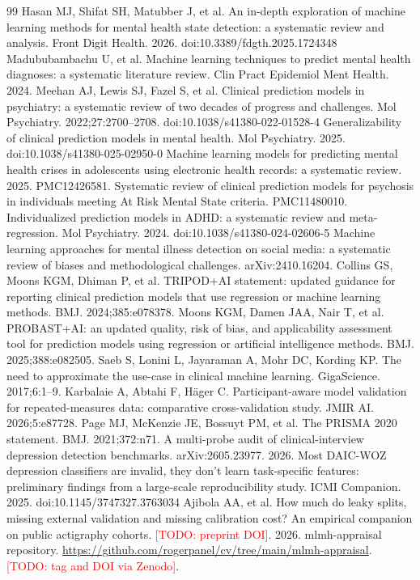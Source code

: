 \documentclass[11pt,a4paper]{article}
\newcommand{\todo}[1]{\textcolor{red}{[TODO: #1]}}
\begin{document}
\begin{thebibliography}{99}\footnotesize
{} Hasan MJ, Shifat SH, Matubber J, et al. An in-depth exploration of machine learning methods for mental health state detection: a systematic review and analysis. Front Digit Health. 2026. doi:10.3389/fdgth.2025.1724348
 Madububambachu U, et al. Machine learning techniques to predict mental health diagnoses: a systematic literature review. Clin Pract Epidemiol Ment Health. 2024.
 Meehan AJ, Lewis SJ, Fazel S, et al. Clinical prediction models in psychiatry: a systematic review of two decades of progress and challenges. Mol Psychiatry. 2022;27:2700--2708. doi:10.1038/s41380-022-01528-4
 Generalizability of clinical prediction models in mental health. Mol Psychiatry. 2025. doi:10.1038/s41380-025-02950-0
 Machine learning models for predicting mental health crises in adolescents using electronic health records: a systematic review. 2025. PMC12426581.
 Systematic review of clinical prediction models for psychosis in individuals meeting At Risk Mental State criteria. PMC11480010.
 Individualized prediction models in ADHD: a systematic review and meta-regression. Mol Psychiatry. 2024. doi:10.1038/s41380-024-02606-5
 Machine learning approaches for mental illness detection on social media: a systematic review of biases and methodological challenges. arXiv:2410.16204.
 Collins GS, Moons KGM, Dhiman P, et al. TRIPOD+AI statement: updated guidance for reporting clinical prediction models that use regression or machine learning methods. BMJ. 2024;385:e078378.
 Moons KGM, Damen JAA, Nair T, et al. PROBAST+AI: an updated quality, risk of bias, and applicability assessment tool for prediction models using regression or artificial intelligence methods. BMJ. 2025;388:e082505.
 Saeb S, Lonini L, Jayaraman A, Mohr DC, Kording KP. The need to approximate the use-case in clinical machine learning. GigaScience. 2017;6:1--9.
 Karbalaie A, Abtahi F, H\"ager C. Participant-aware model validation for repeated-measures data: comparative cross-validation study. JMIR AI. 2026;5:e87728.
 Page MJ, McKenzie JE, Bossuyt PM, et al. The PRISMA 2020 statement. BMJ. 2021;372:n71.
 A multi-probe audit of clinical-interview depression detection benchmarks. arXiv:2605.23977. 2026.
 Most DAIC-WOZ depression classifiers are invalid, they don't learn task-specific features: preliminary findings from a large-scale reproducibility study. ICMI Companion. 2025. doi:10.1145/3747327.3763034
 Ajibola AA, et al. How much do leaky splits, missing external validation and missing calibration cost? An empirical companion on public actigraphy cohorts. \todo{preprint DOI}. 2026.
 mlmh-appraisal repository. \url{https://github.com/rogerpanel/cv/tree/main/mlmh-appraisal}. \todo{tag and DOI via Zenodo}.
\end{thebibliography}
\end{document}
